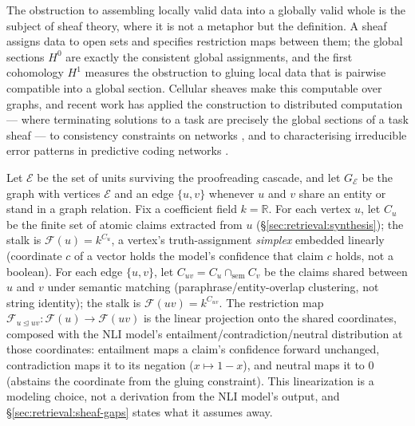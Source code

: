 The obstruction to assembling locally valid data into a globally valid whole is the subject of sheaf theory, where it is not a metaphor but the definition. A sheaf assigns data to open sets and specifies restriction maps between them; the global sections $H^0$ are exactly the consistent global assignments, and the first cohomology $H^1$ measures the obstruction to gluing local data that is pairwise compatible into a global section. Cellular sheaves make this computable over graphs, and recent work has applied the construction to distributed computation --- where terminating solutions to a task are precisely the global sections of a task sheaf \citep{sheafdistributed2025} --- to consistency constraints on networks \citep{sheafnetworks2025}, and to characterising irreducible error patterns in predictive coding networks \citep{sheafpc2025}.

\begin{definition}
\label{def:evidence-sheaf}
Let $\mathcal{E}$ be the set of units surviving the proofreading cascade, and let $G_{\mathcal{E}}$ be the graph with vertices $\mathcal{E}$ and an edge $\{u,v\}$ whenever $u$ and $v$ share an entity or stand in a graph relation. Fix a coefficient field $k = \mathbb{R}$. For each vertex $u$, let $C_u$ be the finite set of atomic claims extracted from $u$ (\S\ref{sec:retrieval:synthesis}); the stalk is $\mathcal{F}(u) = k^{C_u}$, a vertex's truth-assignment \emph{simplex} embedded linearly (coordinate $c$ of a vector holds the model's confidence that claim $c$ holds, not a boolean). For each edge $\{u,v\}$, let $C_{uv} = C_u \cap_{\text{sem}} C_v$ be the claims shared between $u$ and $v$ under semantic matching (paraphrase/entity-overlap clustering, not string identity); the stalk is $\mathcal{F}(uv) = k^{C_{uv}}$. The restriction map $\mathcal{F}_{u \trianglelefteq uv} : \mathcal{F}(u) \to \mathcal{F}(uv)$ is the linear projection onto the shared coordinates, composed with the NLI model's entailment/contradiction/neutral distribution at those coordinates: entailment maps a claim's confidence forward unchanged, contradiction maps it to its negation ($x \mapsto 1-x$), and neutral maps it to $0$ (abstains the coordinate from the gluing constraint). This linearization is a modeling choice, not a derivation from the NLI model's output, and \S\ref{sec:retrieval:sheaf-gaps} states what it assumes away.
\end{definition}

